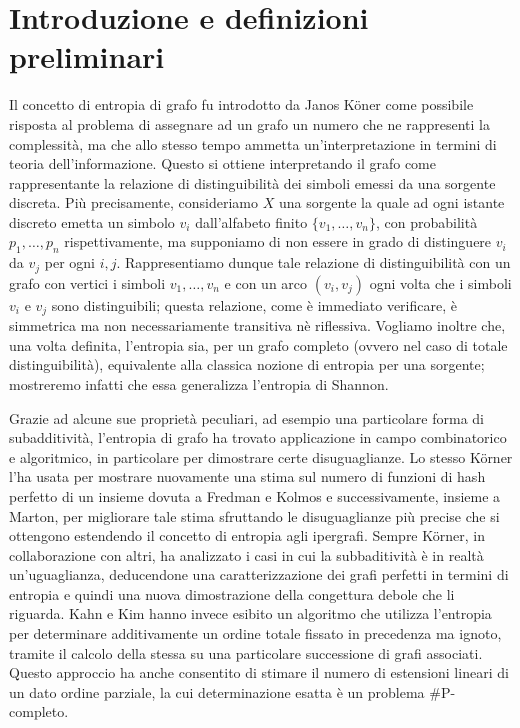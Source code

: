\chapter{Introduzione e definizioni preliminari}
Il concetto di entropia di grafo fu introdotto da Janos K\"oner come possibile risposta al problema di assegnare ad un grafo un numero che ne rappresenti la complessità, ma che allo stesso tempo ammetta un'interpretazione in termini di teoria dell'informazione.
Questo si ottiene interpretando il grafo come rappresentante la relazione di distinguibilità dei simboli emessi da una sorgente discreta. Più precisamente, consideriamo $X$ una sorgente la quale ad ogni istante discreto emetta un simbolo $v_i$ dall'alfabeto finito $\{v_1,\dots,v_n\}$, con probabilità $p_1,\dots,p_n$ rispettivamente, ma supponiamo di non essere in grado di distinguere $v_i$ da $v_j$ per ogni $i,j$. Rappresentiamo dunque tale relazione di distinguibilità con un grafo con vertici i simboli $v_1,\dots,v_n$ e con un arco $(v_i,v_j)$ ogni volta che i simboli $v_i$ e $v_j$ sono distinguibili; questa relazione, come è immediato verificare, è simmetrica ma non necessariamente transitiva nè riflessiva. 
Vogliamo inoltre che, una volta definita, l'entropia sia, per un grafo completo (ovvero nel caso di totale distinguibilità), equivalente alla classica nozione di entropia per una sorgente; mostreremo infatti che essa generalizza l'entropia di Shannon.

Grazie ad alcune sue proprietà peculiari, ad esempio una particolare forma di subadditività, l'entropia di grafo ha trovato applicazione in campo combinatorico e algoritmico, in particolare per dimostrare certe disuguaglianze.
Lo stesso K\"orner l'ha usata per mostrare nuovamente una stima sul numero di funzioni di hash perfetto di un insieme dovuta a Fredman e Kolmos e successivamente, insieme a Marton, per migliorare tale stima sfruttando le disuguaglianze più precise che si ottengono estendendo il concetto di entropia agli ipergrafi. 
Sempre K\"orner, in collaborazione con altri, ha analizzato i casi in cui la subbaditività è in realtà un'uguaglianza, deducendone una caratterizzazione dei grafi perfetti in termini di entropia e quindi una nuova dimostrazione della congettura debole che li riguarda.
Kahn e Kim hanno invece esibito un algoritmo che utilizza l'entropia per determinare additivamente un ordine totale fissato in precedenza ma ignoto, tramite il calcolo della stessa su una particolare successione di grafi associati. Questo approccio ha anche consentito di stimare il numero di estensioni lineari di un dato ordine parziale, la cui determinazione esatta è un problema \#P-completo.

